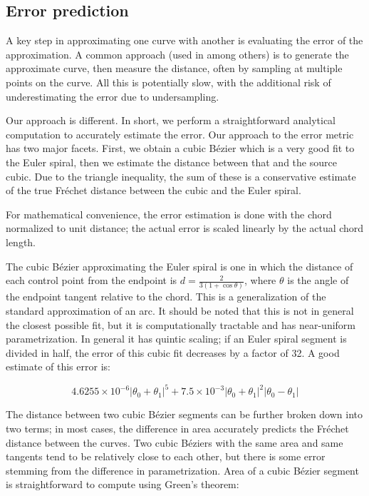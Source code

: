 \documentclass[sigconf, nonacm]{acmart}
\begin{document}
\subsection{Error prediction}

A key step in approximating one curve with another is evaluating the error of the approximation. A common approach (used in \citet{Nehab2020} among others) is to generate the approximate curve, then measure the distance, often by sampling at multiple points on the curve. All this is potentially slow, with the additional risk of underestimating the error due to undersampling.

Our approach is different. In short, we perform a straightforward analytical computation to accurately estimate the error. Our approach to the error metric has two major facets. First, we obtain a cubic Bézier which is a very good fit to the Euler spiral, then we estimate the distance between that and the source cubic. Due to the triangle inequality, the sum of these is a conservative estimate of the true Fréchet distance between the cubic and the Euler spiral.

For mathematical convenience, the error estimation is done with the chord normalized to unit distance; the actual error is scaled linearly by the actual chord length.

The cubic Bézier approximating the Euler spiral is one in which the distance of each control point from the endpoint is $d = \frac{2}{3(1 + \cos \theta)}$, where $\theta$ is the angle of the endpoint tangent relative to the chord. This is a generalization of the standard approximation of an arc. It should be noted that this is not in general the closest possible fit, but it is computationally tractable and has near-uniform parametrization. In general it has quintic scaling; if an Euler spiral segment is divided in half, the error of this cubic fit decreases by a factor of 32. A good estimate of this error is:

\[
    4.6255\times10^{-6}|\theta_0+\theta_1|^5 + 7.5\times10^{-3}|\theta_0+\theta_1|^2|\theta_0-\theta_1|
\]



The distance between two cubic Bézier segments can be further broken down into two terms; in most cases, the difference in area accurately predicts the Fréchet distance between the curves. Two cubic Béziers with the same area and same tangents tend to be relatively close to each other, but there is some error stemming from the difference in parametrization. Area of a cubic Bézier segment is straightforward to compute using Green's theorem:
\end{document}
